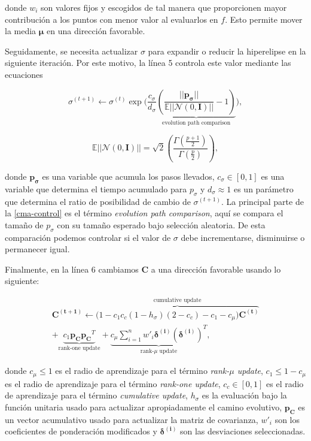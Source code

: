 donde $w_i$ son valores fijos y escogidos de tal manera que proporcionen mayor
contribución a los puntos con menor valor al evaluarlos en $f$. 
Esto permite mover la media $\boldsymbol{\mu}$ en una dirección favorable.

Seguidamente, se necesita actualizar $\sigma$ para expandir o reducir la
hiperelipse en la siguiente iteración. Por este motivo, la línea 5 controla
este valor mediante las ecuaciones

\begin{equation}
    \sigma^{(t + 1)} \gets \sigma^{(t)} \exp\bigg(\frac{c_{\sigma}}{d_{\sigma}}
    \underbrace{\left(\frac{||\boldsymbol{p_{\sigma}}||}{\mathbb{E}||\mathcal{N}(0,
    \mathbf{I})||} - 1 \right)}_{\text{evolution path comparison}} \bigg),
\label{cma-control}
\end{equation}

\begin{equation}
\mathbb{E}||\mathcal{N}(0, \mathbf{I})|| = \sqrt{2} \left(
  \frac{\Gamma\left(\frac{p + 1}{2}\right)}{\Gamma\left({\frac{p}{2}}\right)}
  \right),
\label{cma-E}
\end{equation}

donde $\boldsymbol{p_{\sigma}}$ es una variable que acumula los pasos llevados,
$c_{\sigma} \in [0, 1]$ es una variable que determina el tiempo acumulado para $p_{\sigma}$ y 
$d_{\sigma} \approx 1$ es un parámetro que determina el ratio de posibilidad de cambio de $\sigma^{(t + 1)}$. 
La principal parte de la \autoref{cma-control} es el término \emph{evolution path comparison}, 
aquí se compara el tamaño de $p_{\sigma}$ con su tamaño esperado bajo selección
aleatoria.
De esta comparación podemos controlar si el valor de $\sigma$ debe
incrementarse, disminuirse o permanecer igual.

Finalmente, en la línea 6 cambiamos $\boldsymbol{C}$ a una dirección favorable usando lo siguiente:

\begin{multline}
  \boldsymbol{C^{(t + 1)}} \gets \overbrace{\bigg(1 - c_1 c_c (1 - h_{\sigma})(2 - c_c) - c_1 - c_{\mu}\bigg) \boldsymbol{C^{(t)}}}^{\text{cumulative update}} \\
    + \underbrace{c_{1} \boldsymbol{p_{C}} \boldsymbol{p_{C}}^{T}}_{\text{rank-one update}}
    + \underbrace{c_{\mu}\sum_{i=1}^{n}w'_{i}
    \boldsymbol{\delta^{(i)}}\left(\boldsymbol{\delta^{(i)}}\right)^{T}}_{\text{rank-}\mu\text{ update}},
\label{cma-adapt}
\end{multline}

donde $c_{\mu} \leq 1$ es el radio de aprendizaje para el término \emph{rank-$\mu$ update}, 
$c_1 \leq 1 - c_{\mu}$ es el radio de aprendizaje para el término \emph{rank-one update}, 
$c_c \in [0, 1]$ es el radio de aprendizaje para el término \emph{cumulative update}, 
$h_{\sigma}$ es la evaluación bajo la función unitaria usado para actualizar
apropiadamente el camino evolutivo, 
$\boldsymbol{p_{C}}$ es un vector acumulativo usado para actualizar la matriz de
covarianza, 
$w'_i$ son los coeficientes de ponderación modificados y
$\boldsymbol{\delta^{(i)}}$ son las desviaciones seleccionadas.

